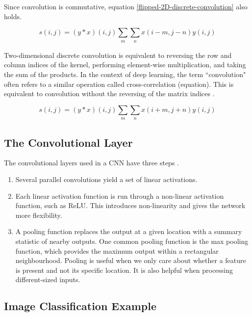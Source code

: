 \documentclass{article}
\begin{document}
Since convolution is commutative, equation \ref{flipped-2D-discrete-convolution} also holds. 

\begin{equation}
    s(i,j) = (y*x)(i,j)\sum\limits_{\substack{m}}\sum\limits_{\substack{n}} x(i-m,j-n)y(i,j)
    \label{flipped-2D-discrete-convolution}
\end{equation}

Two-dimensional discrete convolution is equivalent to reversing the row and column indices of the kernel, performing element-wise multiplication, and taking the sum of the products. In the context of deep learning, the term ``convolution" often refers to a similar operation called cross-correlation (equation). This is equivalent to convolution without the reversing of the matrix indices \cite{Goodfellow-et-al-2016}. 

\begin{equation}
    s(i,j) = (y*x)(i,j)\sum\limits_{\substack{m}}\sum\limits_{\substack{n}} x(i+m,j+n)y(i,j)
    \label{cross-correlation}
\end{equation}

\subsection{The Convolutional Layer}

The convolutional layers used in a CNN have three steps \cite{Goodfellow-et-al-2016}.

\begin{enumerate}
    \item Several parallel convolutions yield a set of linear activations.
    \item Each linear activation function is run through a non-linear activation function, such as ReLU. This introduces non-linearity and gives the network more flexibility. %
    \item A pooling function replaces the output at a given location with a summary statistic of nearby outputs. One common pooling function is the max pooling function, which provides the maximum output within a rectangular neighbourhood. Pooling is useful when we only care about whether a feature is present and not its specific location. It is also helpful when processing different-sized inputs.
\end{enumerate}

\subsection{Image Classification Example}
\end{document}
